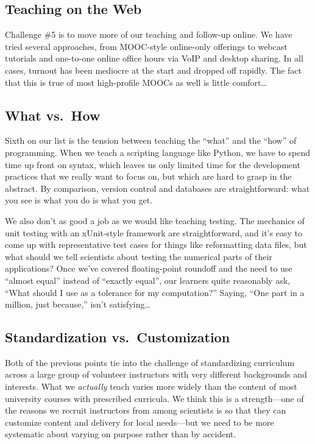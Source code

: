 \documentclass[10pt,a4paper,twocolumn]{article}
\begin{document}
\subsection*{Teaching on the Web}

Challenge \#5 is to move more of our teaching and follow-up online. We
have tried several approaches, from MOOC-style online-only offerings to
webcast tutorials and one-to-one online office hours via VoIP and
desktop sharing. In all cases, turnout has been mediocre at the start
and dropped off rapidly. The fact that this is true of most high-profile
MOOCs as well is little comfort\ldots{}

\subsection*{What vs.~How}

Sixth on our list is the tension between teaching the ``what'' and the
``how'' of programming. When we teach a scripting language like Python,
we have to spend time up front on syntax, which leaves us only limited
time for the development practices that we really want to focus on, but
which are hard to grasp in the abstract. By comparison, version control
and databases are straightforward: what you see is what you do is what
you get.

We also don't as good a job as we would like teaching testing. The
mechanics of unit testing with an xUnit-style framework are
straightforward, and it's easy to come up with representative test cases
for things like reformatting data files, but what should we tell
scientists about testing the numerical parts of their applications? Once
we've covered floating-point roundoff and the need to use ``almost
equal'' instead of ``exactly equal'', our learners quite reasonably ask,
``What should I use as a tolerance for my computation?'' Saying, ``One
part in a million, just because,'' isn't satisfying\ldots{}

\subsection*{Standardization vs.~Customization}

Both of the previous points tie into the challenge of standardizing
curriculum across a large group of volunteer instructors with very
different backgrounds and interests. What we \emph{actually} teach
varies more widely than the content of most university courses with
prescribed curricula. We think this is a strength---one of the reasons
we recruit instructors from among scientists is so that they can
customize content and delivery for local needs---but we need to be more
systematic about varying on purpose rather than by accident.
\end{document}
